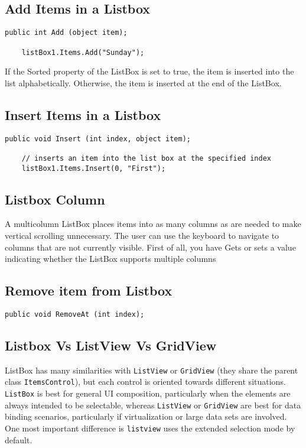\subsection*{Add Items in a Listbox}
\begin{lstlisting}[numbers=none]
	public int Add (object item);
	
	listBox1.Items.Add("Sunday");
\end{lstlisting}


If the Sorted property of the {\cs} ListBox is set to true, the item is inserted into the list alphabetically. Otherwise, the item is inserted at the end of the ListBox.

\subsection*{Insert Items in a Listbox}

\begin{lstlisting}[numbers=none]
	public void Insert (int index, object item);
	
	// inserts an item into the list box at the specified index
	listBox1.Items.Insert(0, "First");
\end{lstlisting}

\subsection*{Listbox Column}
A multicolumn ListBox places items into as many columns as are needed to make vertical scrolling unnecessary. The user can use the keyboard to navigate to columns that are not currently visible. First of all, you have Gets or sets a value indicating whether the ListBox supports multiple columns 

\subsection*{Remove item from Listbox}

\begin{lstlisting}[numbers=none]
	public void RemoveAt (int index);
\end{lstlisting}

\subsection*{Listbox Vs ListView Vs GridView}
{\cs} ListBox has many similarities with \texttt{ListView} or \texttt{GridView} (they share the parent class \texttt{ItemsControl}), but each control is oriented towards different situations. \texttt{ListBox} is best for general UI composition, particularly when the elements are always intended to be selectable, whereas \texttt{ListView} or \texttt{GridView} are best for data binding scenarios, particularly if virtualization or large data sets are involved. One most important difference is \texttt{listview} uses the extended selection mode by default.

